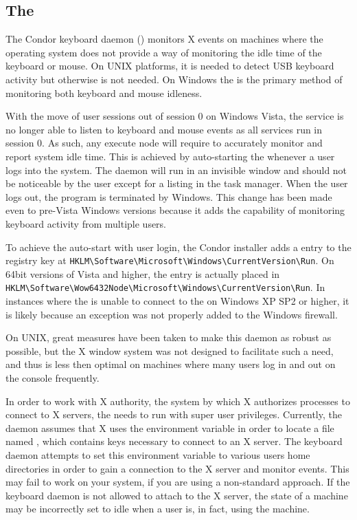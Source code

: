 \subsection{\label{sec:kbdd}The }

The Condor keyboard daemon () monitors X events on
machines where the operating system does not provide a way of
monitoring the idle time of the keyboard or mouse.  On UNIX platforms,
it is needed to detect USB keyboard activity but otherwise is not
needed.  On Windows the  is the primary method of
monitoring both keyboard and mouse idleness.

With the move of user sessions out of session 0 on Windows Vista, the
 service is no longer able to listen to keyboard and
mouse events as all services run in session 0. As such, any execute
node will require  to accurately monitor and report system
idle time. This is achieved by auto-starting the  whenever
a user logs into the system. The daemon will run in an invisible
window and should not be noticeable by the user except for a listing
in the task manager. When the user logs out, the program is terminated
by Windows. This change has been made even to pre-Vista Windows
versions because it adds the capability of monitoring keyboard activity
from multiple users.

To achieve the auto-start with user login, the Condor installer adds a
 entry to the registry key at
\verb|HKLM\Software\Microsoft\Windows\CurrentVersion\Run|. On 64bit versions
of Vista and higher, the entry is actually placed in
\verb|HKLM\Software\Wow6432Node\Microsoft\Windows\CurrentVersion\Run|.  In
instances where the  is unable to connect to the
 on Windows XP SP2 or higher, it is likely because an
exception was not properly added to the Windows firewall.

On UNIX, great measures have been taken to make this daemon as robust
as possible, but the X window system was not designed to facilitate such a
need, and thus is less then optimal on machines where many users log
in and out on the console frequently.

In order to work with X authority, the system by which X authorizes
processes to connect to X servers, the  needs to
run with super user privileges.  Currently, the daemon assumes that X
uses the  environment variable in order to locate a file
named , which contains keys necessary to connect to
an X server.  The keyboard daemon attempts to set this environment
variable to various users home directories in order to gain a
connection to the X server and monitor events.  This may fail to work
on your system, if you are using a non-standard approach.  If the
keyboard daemon is not allowed to attach to the X server, the state of
a machine may be incorrectly set to idle when a user is, in fact,
using the machine.

